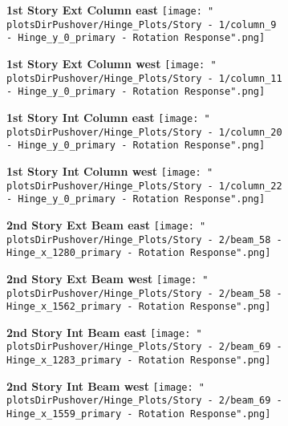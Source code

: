 \documentclass[12pt]{article} %
\begin{document}
		\begin{figure}[h]
			\centering
			\begin{subfigure}{.49\textwidth}
				\centering
				\textbf{1st Story Ext Column east}
				\texttt{[image: "\\plotsDirPushover/Hinge\_Plots/Story - 1/column\_9 - Hinge\_y\_0\_primary - Rotation Response".png]}
			\end{subfigure}
			\begin{subfigure}{.49\textwidth}
				\centering
				\textbf{1st Story Ext Column west}
				\texttt{[image: "\\plotsDirPushover/Hinge\_Plots/Story - 1/column\_11 - Hinge\_y\_0\_primary - Rotation Response".png]}
			\end{subfigure}
		\end{figure}
		\begin{figure}[h]
			\centering
			\begin{subfigure}{.49\textwidth}
				\centering
				\textbf{1st Story Int Column east}
				\texttt{[image: "\\plotsDirPushover/Hinge\_Plots/Story - 1/column\_20 - Hinge\_y\_0\_primary - Rotation Response".png]}
			\end{subfigure}
			\begin{subfigure}{.49\textwidth}
				\centering
				\textbf{1st Story Int Column west}
				\texttt{[image: "\\plotsDirPushover/Hinge\_Plots/Story - 1/column\_22 - Hinge\_y\_0\_primary - Rotation Response".png]}
			\end{subfigure}
		\end{figure}
		\pagebreak
		
		\begin{figure}[h]
			\centering
			\begin{subfigure}{.49\textwidth}
				\centering
				\textbf{2nd Story Ext Beam east}
				\texttt{[image: "\\plotsDirPushover/Hinge\_Plots/Story - 2/beam\_58 - Hinge\_x\_1280\_primary - Rotation Response".png]}
			\end{subfigure}
			\begin{subfigure}{.49\textwidth}
				\centering
				\textbf{2nd Story Ext Beam west}
				\texttt{[image: "\\plotsDirPushover/Hinge\_Plots/Story - 2/beam\_58 - Hinge\_x\_1562\_primary - Rotation Response".png]}
			\end{subfigure}
		\end{figure}
		\begin{figure}[h]
			\centering
			\begin{subfigure}{.49\textwidth}
				\centering
				\textbf{2nd Story Int Beam east}
				\texttt{[image: "\\plotsDirPushover/Hinge\_Plots/Story - 2/beam\_69 - Hinge\_x\_1283\_primary - Rotation Response".png]}
			\end{subfigure}
			\begin{subfigure}{.49\textwidth}
				\centering
				\textbf{2nd Story Int Beam west}
				\texttt{[image: "\\plotsDirPushover/Hinge\_Plots/Story - 2/beam\_69 - Hinge\_x\_1559\_primary - Rotation Response".png]}
			\end{subfigure}
		\end{figure}
		\pagebreak
\end{document}

